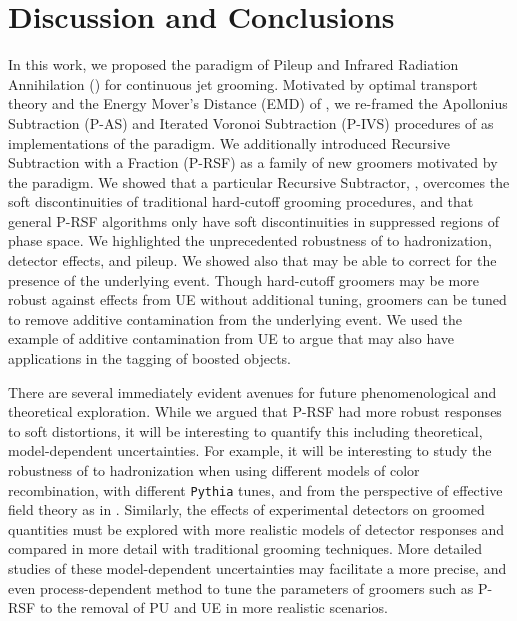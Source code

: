 \section{Discussion and Conclusions}
\label{sec:Conclusions}

In this work, we proposed the paradigm of Pileup and Infrared Radiation Annihilation (\PIRANHA{}) for continuous jet grooming.
%
Motivated by optimal transport theory and the Energy Mover's Distance (EMD) of , we re-framed the Apollonius Subtraction (P-AS) and Iterated Voronoi Subtraction (P-IVS) procedures of  as implementations of the \PIRANHA{} paradigm.
%
We additionally introduced Recursive Subtraction with a Fraction (P-RSF) as a family of new groomers motivated by the \PIRANHA{} paradigm.
%
We showed that a particular Recursive Subtractor, , overcomes the soft discontinuities of traditional hard-cutoff grooming procedures, and that general P-RSF algorithms only have soft discontinuities in suppressed regions of phase space.
%
We highlighted the unprecedented robustness of  to hadronization, detector effects, and pileup.
%
We showed also that  may be able to correct for the presence of the underlying event.
%
Though hard-cutoff groomers may be more robust against effects from UE without additional tuning, \PIRANHA{} groomers can be tuned to remove additive contamination from the underlying event.
%
We used the example of additive contamination from UE to argue that \PIRANHA{} may also have applications in the tagging of boosted objects.

   There are several immediately evident avenues for future phenomenological and theoretical exploration.
    While we argued that P-RSF had more robust responses to soft distortions, it will be interesting to quantify this including theoretical, model-dependent uncertainties.
   For example, it will be interesting to study the robustness of  to hadronization when using different models of color recombination, with different \texttt{Pythia} tunes, and from the perspective of effective field theory as in .
   Similarly, the effects of experimental detectors on  groomed quantities must be explored with more realistic models of detector responses and compared in more detail with traditional grooming techniques.
   More detailed studies of these model-dependent uncertainties may facilitate a more precise, and even process-dependent method to tune the parameters of \PIRANHA{} groomers such as P-RSF to the removal of PU and UE in more realistic scenarios.

